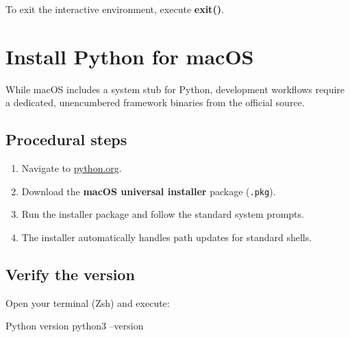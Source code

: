 To exit the interactive environment, execute \textbf{exit()}.

\section{Install Python for macOS}

While macOS includes a system stub for Python, development workflows require a dedicated, unencumbered framework binaries from the official source.

\subsection{Procedural steps}
\begin{enumerate}
    \item Navigate to \href{https://www.python.org/downloads/macos/}{python.org}.
    \item Download the \textbf{macOS universal installer} package (\texttt{.pkg}).
    \item Run the installer package and follow the standard system prompts.
    \item The installer automatically handles path updates for standard shells.
\end{enumerate}

\subsection{Verify the version}
Open your terminal (Zsh) and execute:
\begin{zshbox}{Python version}
python3 --version
\end{zshbox}
